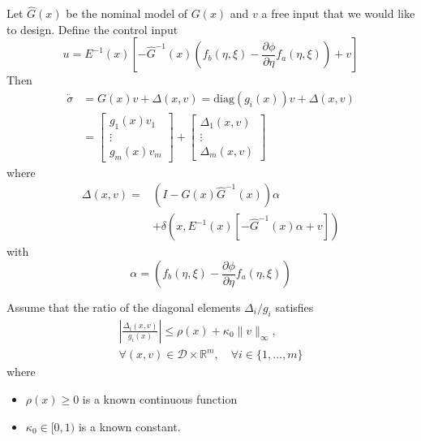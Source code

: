 Let $\hat{G}(x)$ be the nominal model of $G(x)$ and $v$ a free input that we would like to design. Define the control input
\begin{equation*}
    u = E^{-1}(x)\left[ -\hat{G}^{-1}(x)\left( f_b(\eta, \xi) - \frac{\partial \phi}{\partial \eta} f_a(\eta, \xi) \right) + v \right]
\end{equation*}
Then
\begin{align*}
    \dot{\sigma} & = G(x)v + \Delta(x, v) = \mathrm{diag}(g_i(x))v + \Delta(x, v) \\
                 & =\begin{bmatrix}
                        g_1(x)v_1 \\
                        \vdots    \\
                        g_m(x)v_m
                    \end{bmatrix}+
    \begin{bmatrix}
        \Delta_1(x, v) \\
        \vdots         \\
        \Delta_m(x, v)
    \end{bmatrix}
\end{align*}
where
\begin{align*}
    \Delta(x, v) = & \left(I - G(x)\hat{G}^{-1}(x)\right)\alpha                                \\
                   & + \delta\left(x, E^{-1}(x)\left[-\hat{G}^{-1}(x)\alpha + v\right] \right)
\end{align*}
with
\begin{equation*}
    \alpha = \left(f_b(\eta, \xi) - \frac{\partial \phi}{\partial \eta} f_a(\eta, \xi)\right)
\end{equation*}

\newpar{}

Assume that the ratio of the diagonal elements $\Delta_i/g_i$ satisfies
\begin{gather*}
    \left| \frac{\Delta_i(x, v)}{g_i(x)} \right| \leq \rho(x) + \kappa_0 \|v\|_\infty,\\
    \forall (x, v) \in \mathcal{D} \times \mathbb{R}^m,\quad \forall i \in \{1, \dots, m\}
\end{gather*}
where
\begin{itemize}
    \item $\rho(x) \geq 0$ is a known continuous function
    \item $\kappa_0 \in [0, 1)$ is a known constant. %
\end{itemize}

